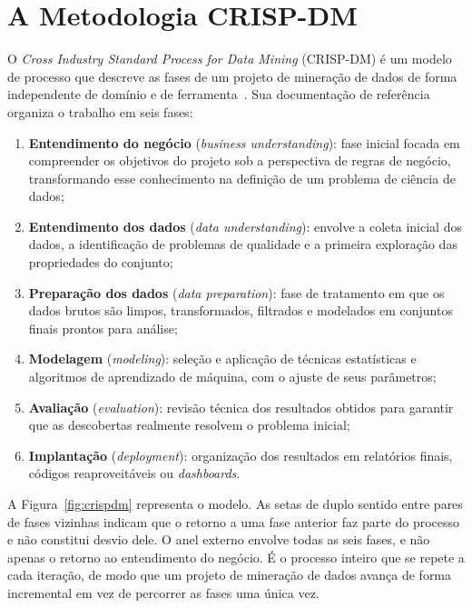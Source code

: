 \section{A Metodologia CRISP-DM}\label{sec:crisp-dm}

O \textit{Cross Industry Standard Process for Data Mining} (CRISP-DM) é um modelo
de processo que descreve as fases de um projeto de mineração de dados de forma
independente de domínio e de ferramenta~\cite{Wirth2000}. Sua documentação de
referência~\cite{Chapman2000} organiza o trabalho em seis fases:

\begin{enumerate}
  \item \textbf{Entendimento do negócio} (\textit{business understanding}): fase
    inicial focada em compreender os objetivos do projeto sob a perspectiva de
    regras de negócio, transformando esse conhecimento na definição de um
    problema de ciência de dados;
  \item \textbf{Entendimento dos dados} (\textit{data understanding}): envolve a
    coleta inicial dos dados, a identificação de problemas de qualidade e a
    primeira exploração das propriedades do conjunto;
  \item \textbf{Preparação dos dados} (\textit{data preparation}): fase de
    tratamento em que os dados brutos são limpos, transformados, filtrados e
    modelados em conjuntos finais prontos para análise;
  \item \textbf{Modelagem} (\textit{modeling}): seleção e aplicação de técnicas
    estatísticas e algoritmos de aprendizado de máquina, com o ajuste de seus
    parâmetros;
  \item \textbf{Avaliação} (\textit{evaluation}): revisão técnica dos resultados
    obtidos para garantir que as descobertas realmente resolvem o problema
    inicial;
  \item \textbf{Implantação} (\textit{deployment}): organização dos resultados em
    relatórios finais, códigos reaproveitáveis ou \textit{dashboards}.
\end{enumerate}

A Figura~\ref{fig:crispdm} representa o modelo. As setas de duplo sentido entre
pares de fases vizinhas indicam que o retorno a uma fase anterior faz parte do
processo e não constitui desvio dele. O anel externo envolve todas as seis
fases, e não apenas o retorno ao entendimento do negócio. É o processo inteiro
que se repete a cada iteração, de modo que um projeto de mineração de dados
avança de forma incremental em vez de percorrer as fases uma única vez.

